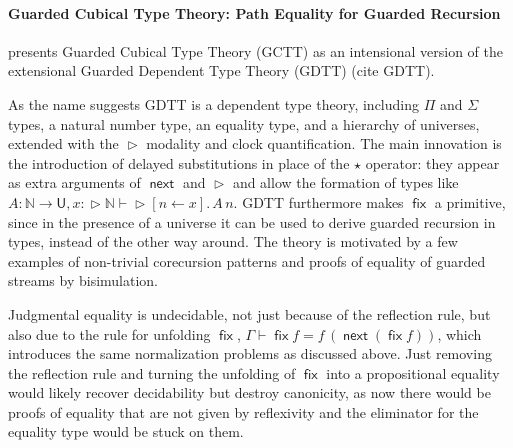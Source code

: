 \documentclass{book}
\DeclareMathOperator{\fix}{\mathsf{fix}}
\DeclareMathOperator{\Later}{\vartriangleright}
\DeclareMathOperator{\next}{\ensuremath{\mathsf{next}}}
\newcommand{\sd}{.\,}
\begin{document}


  \paragraph{Guarded Cubical Type Theory: Path Equality for Guarded Recursion}
  presents Guarded Cubical Type Theory (GCTT) as an intensional
  version of the extensional Guarded Dependent Type Theory (GDTT)
  (cite GDTT).

  As the name suggests GDTT is a dependent type theory, including
  $\Pi$ and $\Sigma$ types, a natural number type, an equality type, and a hierarchy of
  universes, extended with the $\Later$ modality and clock
  quantification. The main innovation is the introduction of delayed
  substitutions in place of the $\star$ operator: they appear as extra
  arguments of $\next$ and $\Later$ and allow the formation of types
  like $ A : \mathbb{N} \to \mathsf{U}, x : \Later \mathbb{N} \vdash
  \Later [n \leftarrow x]\sd A\,n$.
  GDTT furthermore makes $\fix$ a primitive, since in the presence of
  a universe it can be used to derive guarded recursion in types,
  instead of the other way around. The theory is motivated by a few
  examples of non-trivial corecursion patterns and proofs of equality
  of guarded streams by bisimulation.

  Judgmental equality is undecidable, not just because of the
  reflection rule, but also due to the rule for unfolding $\fix$,
  $\Gamma \vdash \fix f = f\,(\next (\fix f))$, which introduces the
  same normalization problems as discussed above. Just removing the
  reflection rule and turning the unfolding of $\fix$ into a
  propositional equality would likely recover decidability but destroy
  canonicity, as now there would be proofs of equality that are not
  given by reflexivity and the eliminator for the equality type would
  be stuck on them.
\end{document}
